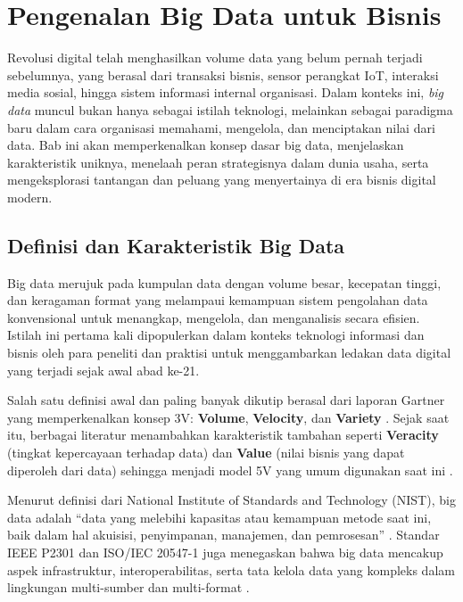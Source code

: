 \chapter{Pengenalan Big Data untuk Bisnis}


\noindent
Revolusi digital telah menghasilkan volume data yang belum pernah terjadi sebelumnya, yang berasal dari transaksi bisnis, sensor perangkat IoT, interaksi media sosial, hingga sistem informasi internal organisasi. Dalam konteks ini, \textit{big data} muncul bukan hanya sebagai istilah teknologi, melainkan sebagai paradigma baru dalam cara organisasi memahami, mengelola, dan menciptakan nilai dari data. Bab ini akan memperkenalkan konsep dasar big data, menjelaskan karakteristik uniknya, menelaah peran strategisnya dalam dunia usaha, serta mengeksplorasi tantangan dan peluang yang menyertainya di era bisnis digital modern.


\section{Definisi dan Karakteristik Big Data}

Big data merujuk pada kumpulan data dengan volume besar, kecepatan tinggi, dan keragaman format yang melampaui kemampuan sistem pengolahan data konvensional untuk menangkap, mengelola, dan menganalisis secara efisien. Istilah ini pertama kali dipopulerkan dalam konteks teknologi informasi dan bisnis oleh para peneliti dan praktisi untuk menggambarkan ledakan data digital yang terjadi sejak awal abad ke-21.

Salah satu definisi awal dan paling banyak dikutip berasal dari laporan Gartner yang memperkenalkan konsep 3V: \textbf{Volume}, \textbf{Velocity}, dan \textbf{Variety} \cite{laney2001}. Sejak saat itu, berbagai literatur menambahkan karakteristik tambahan seperti \textbf{Veracity} (tingkat kepercayaan terhadap data) dan \textbf{Value} (nilai bisnis yang dapat diperoleh dari data) sehingga menjadi model 5V yang umum digunakan saat ini \cite{gandomi2015}.

Menurut definisi dari National Institute of Standards and Technology (NIST), big data adalah ``data yang melebihi kapasitas atau kemampuan metode saat ini, baik dalam hal akuisisi, penyimpanan, manajemen, dan pemrosesan'' \cite{nist2015}. Standar IEEE P2301 dan ISO/IEC 20547-1 juga menegaskan bahwa big data mencakup aspek infrastruktur, interoperabilitas, serta tata kelola data yang kompleks dalam lingkungan multi-sumber dan multi-format \cite{iso20547}.

